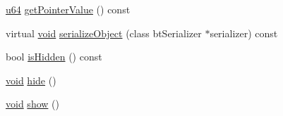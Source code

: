 \begin{DoxyCompactItemize}
\item 
\mbox{\hyperlink{_util_8h_ad758b7a5c3f18ed79d2fcd23d9f16357}{u64}} \mbox{\hyperlink{classnjli_1_1_button_h_u_d_a4ffddf141a426a5a07d0ac19f1913811}{get\+Pointer\+Value}} () const
\item 
virtual \mbox{\hyperlink{_thread_8h_af1e856da2e658414cb2456cb6f7ebc66}{void}} \mbox{\hyperlink{classnjli_1_1_button_h_u_d_a4fc4bcd9d1930911474210c047372fc0}{serialize\+Object}} (class bt\+Serializer $\ast$serializer) const
\item 
bool \mbox{\hyperlink{classnjli_1_1_button_h_u_d_a3009efb11b4bcd56bd933c21b230a125}{is\+Hidden}} () const
\item 
\mbox{\hyperlink{_thread_8h_af1e856da2e658414cb2456cb6f7ebc66}{void}} \mbox{\hyperlink{classnjli_1_1_button_h_u_d_a5d7b8b3bc421084f282343e506a6d289}{hide}} ()
\item 
\mbox{\hyperlink{_thread_8h_af1e856da2e658414cb2456cb6f7ebc66}{void}} \mbox{\hyperlink{classnjli_1_1_button_h_u_d_a73ffd499fceaacd59b518a541ed2133e}{show}} ()
\end{DoxyCompactItemize}
